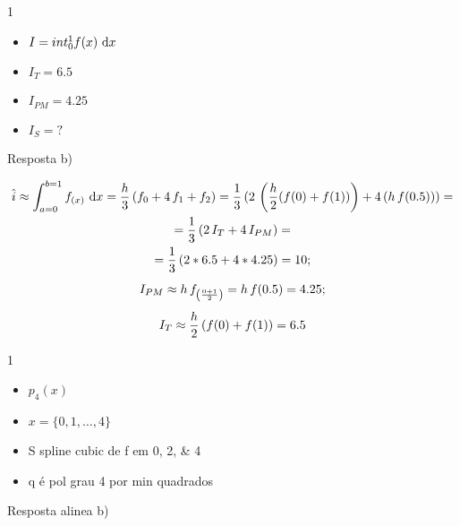 \documentclass["CN_A-Tests_Resolutions.tex"]{subfiles}
\begin{document}
\begin{questionBox}1{} %
  
  \begin{itemize}
    \item \(I=int_0^1{f(x)\,\odif{x}}\)
    \item \(I_T= 6.5\)
    \item \(I_{PM}=4.25\)
    \item \(I_{S}=?\)
  \end{itemize}

  \answer{}

  Resposta b)

  \begin{gather*}
    \hat{i}
    \approx\int_{a=0}^{b=1}{f_{(x)}\,\odif{x}}
    =\frac{h}{3}\,(f_0+4\,f_1+f_2)
    = \frac{1}{3}\,(
      2\,\left(\frac{h}{2}(f(0)+f(1))\right)
      + 4\,( h\,f(0.5))
    )
    = \\
    = \frac{1}{3}\,(
      2\,I_T
      + 4\,I_{PM}
    )
    = \\
    = \frac{1}{3}\,(
      2*6.5
      + 4* 4.25
    )
    = 10
    ; \\[1ex]
    I_{PM}
    \approx h\,f_{\left(\frac{0+1}{2}\right)}
    = h\,f(0.5)
    = 4.25
    ; \\[1ex]
    I_T
    \approx \frac{h}{2}\,(f(0)+f(1))
    = 6.5
  \end{gather*}

\end{questionBox}

\begin{questionBox}1{} %

  \begin{itemize}
    \item \(p_4(x)\)
    \item \(x=\{0,1,\dots,4\}\)
    \item S spline cubic de f em \numlist*{0;2;4}
    \item q é pol grau 4 por min quadrados
  \end{itemize}

  \answer{}

  Resposta alinea b)

\end{questionBox}
\end{document}
